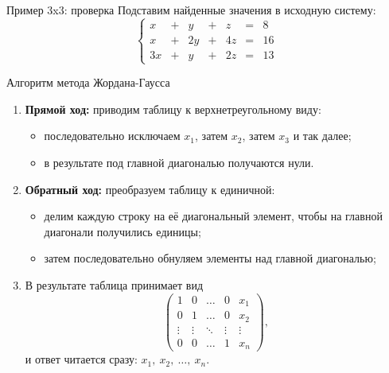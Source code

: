 \documentclass[12pt,aspectratio=169]{beamer}
\begin{document}
\begin{frame}{Пример 3x3: проверка}
    Подставим найденные значения в исходную систему:
    \[
    \left\{
    \begin{array}{ccccccc}
      x  & + &  y & + &  z & = &  8 \\
      x  & + & 2y & + & 4z & = & 16 \\
     3x  & + &  y & + & 2z & = & 13
    \end{array}
    \right.
    \]
    \vspace{0.3cm}
\end{frame}

\begin{frame}{Алгоритм метода Жордана-Гаусса}
    \begin{enumerate}
        \item \textbf{Прямой ход:} приводим таблицу к \alert{верхнетреугольному} виду:
        \begin{itemize}
            \item последовательно исключаем \(x_1\), затем \(x_2\), затем \(x_3\) и так далее;
            \item в результате под главной диагональю получаются нули.
        \end{itemize}
        \item \textbf{Обратный ход:} преобразуем таблицу к \alert{единичной}:
        \begin{itemize}
            \item делим каждую строку на её диагональный элемент, чтобы на главной диагонали получились единицы;
            \item затем последовательно обнуляем элементы \alert{над} главной диагональю;
        \end{itemize}
        \item В результате таблица принимает вид
        \[
        \left(\begin{array}{cccc|c}
            1 & 0 & \ldots & 0 & x_1 \\
            0 & 1 & \ldots & 0 & x_2 \\
            \vdots & \vdots & \ddots & \vdots & \vdots \\
            0 & 0 & \ldots & 1 & x_n
        \end{array}\right),
        \]
        и ответ читается сразу: \(x_1,\ x_2,\ \ldots,\ x_n\).
    \end{enumerate}
\end{frame}
\end{document}
